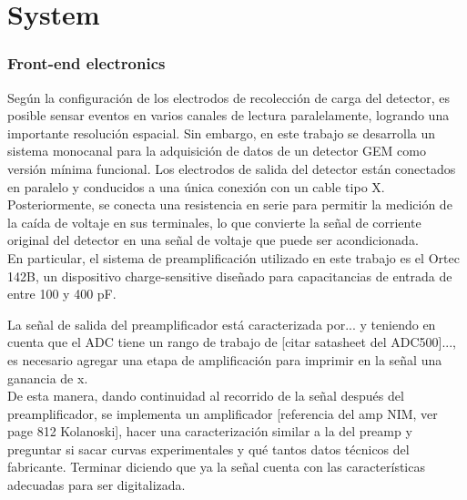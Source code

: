 \documentclass[]{book}
\begin{document}
\chapter*{System}

\subsection*{Front-end electronics}
\noindent Según la configuración de los electrodos de recolección de carga del detector, es posible sensar eventos en varios canales de lectura paralelamente, logrando una importante resolución espacial. Sin embargo, en este trabajo se desarrolla un sistema monocanal para la adquisición de datos de un detector GEM como versión mínima funcional. Los electrodos de salida del detector están conectados en paralelo y conducidos a una única conexión con un cable tipo X. Posteriormente, se conecta una resistencia en serie para permitir la medición de la caída de voltaje en sus terminales, lo que convierte la señal de corriente original del detector en una señal de voltaje que puede ser acondicionada.\\


En particular, el sistema de preamplificación utilizado en este trabajo es el Ortec 142B, un dispositivo charge-sensitive diseñado para capacitancias de entrada de entre 100 y 400 pF. %

La señal de salida del preamplificador está caracterizada por... y teniendo en cuenta que el ADC tiene un rango de trabajo de [citar satasheet del ADC500]..., es necesario agregar una etapa de amplificación para imprimir en la señal una ganancia de x.\\



\noindent De esta manera, dando continuidad al recorrido de la señal después del preamplificador, se implementa un amplificador [referencia del amp NIM, ver page 812 Kolanoski], hacer una caracterización similar a la del preamp y preguntar si sacar curvas experimentales y qué tantos datos técnicos del fabricante. Terminar diciendo que ya la señal cuenta con las características adecuadas para ser digitalizada. \\
\end{document}
